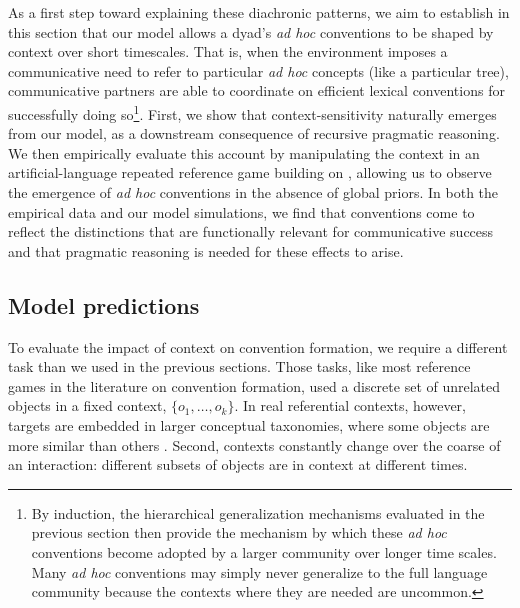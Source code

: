 As a first step toward explaining these diachronic patterns, we aim to establish in this section that our model allows a dyad's \emph{ad hoc} conventions to be shaped by context over short timescales.
That is, when the environment imposes a communicative need to refer to particular \emph{ad hoc} concepts (like a particular tree), communicative partners are able to coordinate on efficient lexical conventions for successfully doing so\footnote{By induction, the hierarchical generalization mechanisms evaluated in the previous section then provide the mechanism by which these \emph{ad hoc} conventions become adopted by a larger community over longer time scales. Many \emph{ad hoc} conventions may simply never generalize to the full language community because the contexts where they are needed are uncommon.}.
First, we show that context-sensitivity naturally emerges from our model, as a downstream consequence of recursive pragmatic reasoning.
We then empirically evaluate this account by manipulating the context in an artificial-language repeated reference game building on , allowing us to observe the emergence of \emph{ad hoc} conventions in the absence of global priors.
In both the empirical data and our model simulations, we find that conventions come to reflect the distinctions that are functionally relevant for communicative success and that pragmatic reasoning is needed for these effects to arise. 


\subsection{Model predictions}

To evaluate the impact of context on convention formation, we require a different task than we used in the previous sections.
Those tasks, like most reference games in the literature on convention formation, used a discrete set of unrelated objects in a fixed context, $\{o_1, \dots, o_k\}$. 
In real referential contexts, however, targets are embedded in larger conceptual taxonomies, where some objects are more similar than others \cite{bruner1956study,collins1969retrieval,XuTenenbaum07_WordLearningBayesian}.
Second, contexts constantly change over the coarse of an interaction: different subsets of objects are in context at different times.


